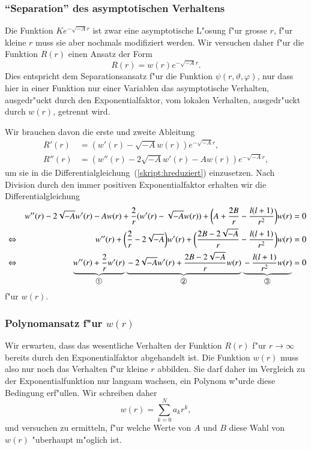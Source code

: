 \subsubsection{``Separation'' des asymptotischen Verhaltens}
Die Funktion $Ke^{-\sqrt{-A}r}$ ist zwar eine asymptotische L"osung
f"ur grosse $r$, f"ur kleine $r$ muss sie aber nochmals modifiziert
werden.
Wir versuchen daher f"ur die Funktion $R(r)$ einen Ansatz der Form
\begin{equation}
R(r)=w(r)e^{-\sqrt{-A}r}.
\label{skript:Ransatz}
\end{equation}
Dies entspricht dem Separationsansatz f"ur die Funktion
$\psi(r,\vartheta,\varphi)$, nur dass hier in einer Funktion nur einer
Variablen das asymptotische Verhalten, ausgedr"uckt durch den
Exponentialfaktor, vom lokalen Verhalten, ausgedr"uckt durch $w(r)$,
getrennt wird.

Wir brauchen davon die erste und zweite Ableitung
\begin{align*}
R'(r)&=(w'(r)-\sqrt{-A}w(r))e^{-\sqrt{-A}r},
\\
R''(r)&=(w''(r)-2\sqrt{-A}w'(r)-Aw(r))e^{-\sqrt{-A}r},
\end{align*}
um sie in die Differentialgleichung~(\ref{skript:hreduziert}) einzusetzen.
Nach Division durch den immer positiven Exponentialfaktor
erhalten wir die Differentialgleichung
\begin{align}
&&
w''(r)-2\sqrt{-A}w'(r)-Aw(r)
+\frac2{r}(w'(r)-\sqrt{-A}w(r))
+\biggl(A+\frac{2B}r-\frac{l(l+1)}{r^2}\biggr)w(r)&=0
\notag
\\
&\Leftrightarrow&
w''(r)+\biggl(\frac{2}{r}-2\sqrt{-A}\biggr)w'(r)
+\biggl(\frac{2B-2\sqrt{-A}}{r}-\frac{l(l+1)}{r^2}\biggr)w(r)&=0
\notag
\\
&\Leftrightarrow&
\underbrace{
w''(r)+\frac{2}{r}w'(r)
}_{\text{\normalsize\ding{192}}}
\underbrace{\mathstrut-2\sqrt{-A}w'(r)
+\frac{2B-2\sqrt{-A}}{r} w(r)
}_{\text{\normalsize\ding{193}}}
\underbrace{\mathstrut-\frac{l(l+1)}{r^2}w(r)}_{\text{\normalsize\ding{194}}}&=0
\label{skript:wequation}
\end{align}
f"ur $w(r)$.

\subsubsection{Polynomansatz f"ur $w(r)$}
Wir erwarten, dass das wesentliche Verhalten der Funktion $R(r)$ 
f"ur $r\to\infty$ bereits durch den Exponentialfaktor abgehandelt ist.
Die Funktion $w(r)$ muss also nur noch das Verhalten f"ur kleine $r$
abbilden.
Sie darf daher im Vergleich zu der Exponentialfunktion nur langsam wachsen,
ein Polynom w"urde diese Bedingung erf"ullen.
Wir schreiben daher
\[
w(r)=\sum_{k=0}^N a_kr^k,
\]
und versuchen zu ermitteln, f"ur welche Werte von $A$ und $B$ diese
Wahl von $w(r)$ "uberhaupt m"oglich ist.

